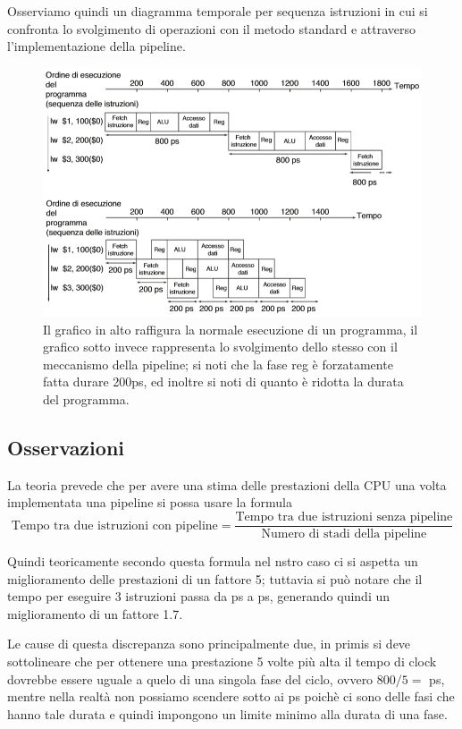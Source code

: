 \documentclass[class=book, crop=false, oneside]{standalone}
\begin{document}
Osserviamo quindi un diagramma temporale per sequenza istruzioni in cui si confronta lo svolgimento di operazioni con il metodo standard e attraverso l'implementazione della pipeline.
\begin{figure}
	\centering
	\includegraphics[width=\textwidth,keepaspectratio]{esecuzione-operazioni-confronto.png}
	\caption{Il grafico in alto raffigura la normale esecuzione di un programma, il grafico sotto invece rappresenta lo svolgimento dello stesso con il meccanismo della pipeline; si noti che la fase reg è forzatamente fatta durare 200ps, ed inoltre si noti di quanto è ridotta la durata del programma.}
\end{figure}


\subsection{Osservazioni}
La teoria prevede che per avere una stima delle prestazioni della CPU una volta implementata una pipeline si possa usare la formula \[\text{Tempo tra due istruzioni con pipeline} = \frac{\text{Tempo tra due istruzioni senza pipeline}}{\text{Numero di stadi della pipeline}}\]

Quindi teoricamente secondo questa formula nel nstro caso ci si aspetta un miglioramento delle prestazioni di un fattore 5; tuttavia si può notare che il tempo per eseguire 3 istruzioni passa da \unit[2400]{ps} a \unit[1400]{ps}, generando quindi un miglioramento di un fattore 1.7.

Le cause di questa discrepanza sono principalmente due, in primis si deve sottolineare che per ottenere una prestazione 5 volte più alta il tempo di clock dovrebbe essere uguale a quelo di una singola fase del ciclo, ovvero \(800/5=\) \unit[160]{ps}, mentre nella realtà non possiamo scendere sotto ai \unit[200]{ps} poichè ci sono delle fasi che hanno tale durata e quindi impongono un limite minimo alla durata di una fase.
\end{document}
